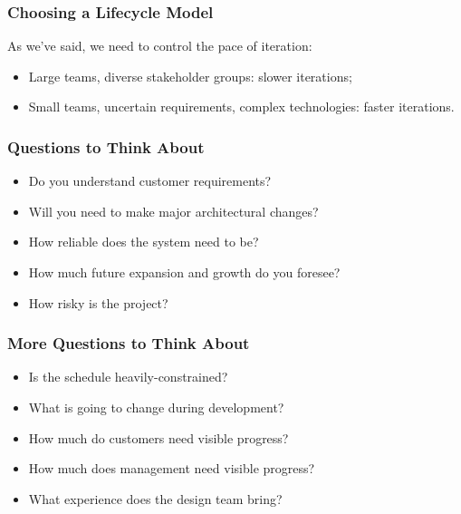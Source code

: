 \begin{frame}
\frametitle{Choosing a Lifecycle Model}

\begin{changemargin}{1cm}
As we've said, we need to control the pace of iteration:
\begin{itemize}
\item Large teams, diverse stakeholder groups: slower iterations;
\item Small teams, uncertain requirements, complex technologies: faster iterations.
\end{itemize}
\end{changemargin}

\end{frame}


\begin{frame}
\frametitle{Questions to Think About}

\large
\begin{changemargin}{0.5cm}
\begin{itemize}
\item Do you understand customer requirements?\\[0.5em]
\item Will you need to make major architectural changes?\\[0.5em]
\item How reliable does the system need to be?\\[0.5em]
\item How much future expansion and growth do you foresee?\\[0.5em]
\item How risky is the project?
\end{itemize}
\end{changemargin}
\end{frame}

\begin{frame}
\frametitle{More Questions to Think About}

\large
\begin{changemargin}{0.5cm}
\begin{itemize}
\item Is the schedule heavily-constrained?\\[0.5em]
\item What is going to change during development?\\[0.5em]
\item How much do customers need visible progress?\\[0.5em]
\item How much does management need visible progress?\\[0.5em]
\item What experience does the design team bring?
\end{itemize}
\end{changemargin}
\end{frame}

